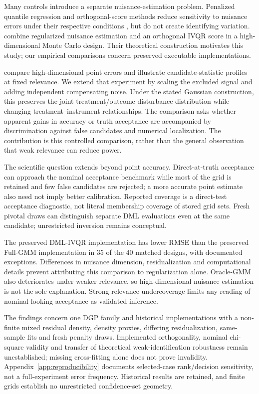 Many controls introduce a separate nuisance-estimation problem. Penalized quantile regression and orthogonal-score methods reduce sensitivity to nuisance errors under their respective conditions \parencite{belloni_chernozhukov_2011,belloni_chernozhukov_kato_2019,chernozhukov_et_al_2018}, but do not create identifying variation. \textcite{chen_huang_tien_2021} combine regularized nuisance estimation and an orthogonal IVQR score in a high-dimensional Monte Carlo design. Their theoretical construction motivates this study; our empirical comparisons concern preserved executable implementations.

\textcite{chen_huang_tien_2021} compare high-dimensional point errors and illustrate candidate-statistic profiles at fixed relevance. We extend that experiment by scaling the excluded signal and adding independent compensating noise. Under the stated Gaussian construction, this preserves the joint treatment/outcome-disturbance distribution while changing treatment--instrument relationships. The comparison asks whether apparent gains in accuracy or truth acceptance are accompanied by discrimination against false candidates and numerical localization. The contribution is this controlled comparison, rather than the general observation that weak relevance can reduce power.

The scientific question extends beyond point accuracy. Direct-at-truth acceptance can approach the nominal acceptance benchmark while most of the grid is retained and few false candidates are rejected; a more accurate point estimate also need not imply better calibration. Reported coverage is a direct-test acceptance diagnostic, not literal membership coverage of stored grid sets. Fresh pivotal draws can distinguish separate DML evaluations even at the same candidate; unrestricted inversion remains conceptual.

The preserved DML-IVQR implementation has lower RMSE than the preserved Full-GMM implementation in 35 of the 40 matched designs, with documented exceptions. Differences in nuisance dimension, residualization and computational details prevent attributing this comparison to regularization alone. Oracle-GMM also deteriorates under weaker relevance, so high-dimensional nuisance estimation is not the sole explanation. Strong-relevance undercoverage limits any reading of nominal-looking acceptance as validated inference.

The findings concern one DGP family and historical implementations with a non-finite mixed residual density, density proxies, differing residualization, same-sample fits and fresh penalty draws. Implemented orthogonality, nominal chi-square validity and transfer of theoretical weak-identification robustness remain unestablished; missing cross-fitting alone does not prove invalidity. Appendix~\ref{app:reproducibility} documents selected-case rank/decision sensitivity, not a full-experiment error frequency. Historical results are retained, and finite grids establish no unrestricted confidence-set geometry.

